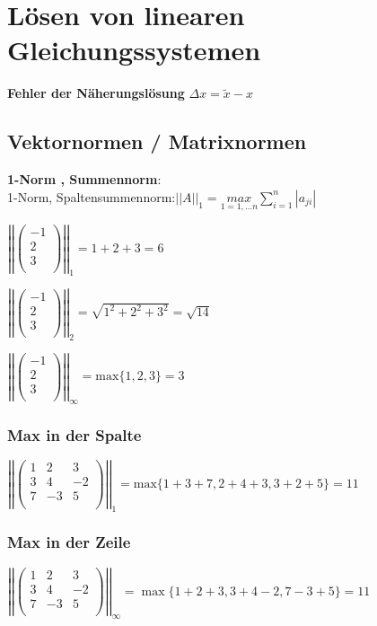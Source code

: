 \documentclass{article}
\begin{document}
\section{Lösen von linearen Gleichungssystemen}

\textbf{Fehler der Näherungslösung}
$\Delta x = \tilde{x} - x$

\subsection{Vektornormen / Matrixnormen}

\textbf{1-Norm , Summennorm}: \\
1-Norm, Spaltensummennorm:$||A||_1 = \underset{1=1,...n}{max} \sum_{i=1}^{n} |a_{ji} |$


$
\left|
\left|
\begin{pmatrix}
-1 \\
2 \\
3 \\
\end{pmatrix}
\right|
\right|
_1
=
1+2+3=6
$

$
\left|
\left|
\begin{pmatrix}
-1 \\
2 \\
3 \\
\end{pmatrix}
\right|
\right|
_2
=
\sqrt{1^2+2^2+3^2}= \sqrt{14}
$

$
\left|
\left|
\begin{pmatrix}
-1 \\
2 \\
3 \\
\end{pmatrix}
\right|
\right|
_{\infty}
=
\text{max} \{ 1,2,3 \} =3
$

\subsubsection{Max in der Spalte}

$
\left|
\left|
\begin{pmatrix}
1 & 2 & 3 \\
3 & 4 & -2 \\
7 & -3 & 5 \\
\end{pmatrix}
\right|
\right|
_1
=
\text{max} \{1+3+7, 2+4+3, 3+2+5 \} = 11
$


\subsubsection{Max in der Zeile}

$
\left|
\left|
\begin{pmatrix}
1 & 2 & 3 \\
3 & 4 & -2 \\
7 & -3 & 5 \\
\end{pmatrix}
\right|
\right|
_{\infty}
=
\max \{1+2+3, 3+4-2, 7-3+5 \} = 11
$
\end{document}
